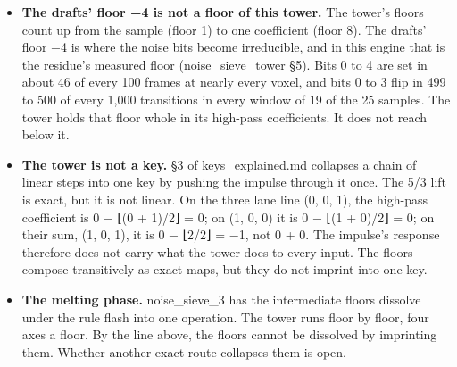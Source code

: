 \begin{itemize}
\item \textbf{The drafts' floor −4 is not a floor of this tower.} The tower's floors count up from the sample (floor 1) to one coefficient (floor 8). The drafts' floor −4 is where the noise bits become irreducible, and in this engine that is the residue's measured floor (noise\_\allowbreak{}sieve\_\allowbreak{}tower §5). Bits 0 to 4 are set in about 46 of every 100 frames at nearly every voxel, and bits 0 to 3 flip in 499 to 500 of every 1,000 transitions in every window of 19 of the 25 samples. The tower holds that floor whole in its high-pass coefficients. It does not reach below it.
\item \textbf{The tower is not a key.} §3 of \hyperref[chap:keys-explained]{keys\_\allowbreak{}explained.md} collapses a chain of linear steps into one key by pushing the impulse through it once. The 5/3 lift is exact, but it is not linear. On the three lane line (0, 0, 1), the high-pass coefficient is 0 − ⌊(0 + 1)/2⌋ = 0; on (1, 0, 0) it is 0 − ⌊(1 + 0)/2⌋ = 0; on their sum, (1, 0, 1), it is 0 − ⌊2/2⌋ = −1, not 0 + 0. The impulse's response therefore does not carry what the tower does to every input. The floors compose transitively as exact maps, but they do not imprint into one key.
\item \textbf{The melting phase.} noise\_\allowbreak{}sieve\_\allowbreak{}3 has the intermediate floors dissolve under the rule flash into one operation. The tower runs floor by floor, four axes a floor. By the line above, the floors cannot be dissolved by imprinting them. Whether another exact route collapses them is open.
\end{itemize}


